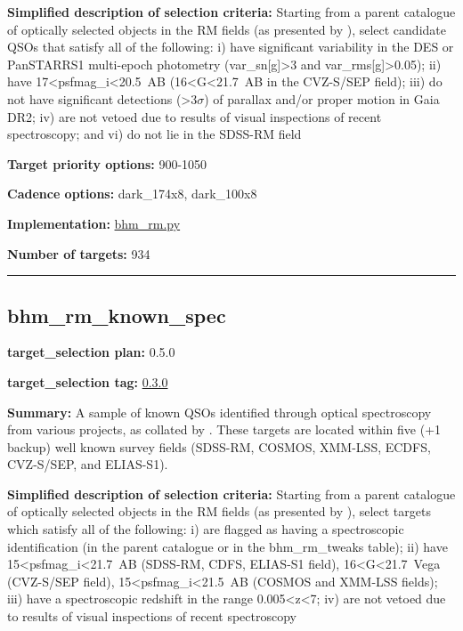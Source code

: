 \noindent\textbf{Simplified description of selection criteria:} Starting from a
parent catalogue of optically selected objects in the RM fields (as
presented by
\citealt{Yang2022}), select candidate QSOs that satisfy all of the
following: i) have significant variability in the DES or PanSTARRS1
multi-epoch photometry (var\_sn{[}g{]}\textgreater{}3 and
var\_rms{[}g{]}\textgreater{}0.05); ii) have
17\textless{}psfmag\_i\textless{}20.5~AB
(16\textless{}G\textless{}21.7~AB in the CVZ-S/SEP field); iii) do not
have significant detections (\textgreater{}3$\sigma$) of parallax and/or proper
motion in Gaia DR2; iv) are not vetoed due to results of visual
inspections of recent spectroscopy; and vi) do not lie in the SDSS-RM
field


\noindent\textbf{Target priority options:} 900-1050

\noindent\textbf{Cadence options:} dark\_174x8, dark\_100x8

\noindent\textbf{Implementation:}
\href{https://github.com/sdss/target_selection/blob/0.3.0/python/target_selection/cartons/bhm_rm.py}{bhm\_rm.py}

\noindent\textbf{Number of targets:} 934

\begin{center}\rule{0.5\linewidth}{0.5pt}\end{center}

\hypertarget{bhm_rm_known_spec_plan0.5.0}{%
\subsection{bhm\_rm\_known\_spec}\label{bhm_rm_known_spec_plan0.5.0}}

\noindent\textbf{target\_selection plan:} 0.5.0

\noindent\textbf{target\_selection tag:}
\href{https://github.com/sdss/target_selection/tree/0.3.0/}{0.3.0}

\noindent\textbf{Summary:} A sample of known QSOs identified through optical
spectroscopy from various projects, as collated by
\citet{Yang2022}. These targets are located within five (+1 backup) well
known survey fields (SDSS-RM, COSMOS, XMM-LSS, ECDFS, CVZ-S/SEP, and
ELIAS-S1).

\noindent\textbf{Simplified description of selection criteria:} Starting from a
parent catalogue of optically selected objects in the RM fields (as
presented by
\citealt{Yang2022}), select targets which satisfy all of the following: i)
are flagged as having a spectroscopic identification (in the parent
catalogue or in the bhm\_rm\_tweaks table); ii) have
15\textless{}psfmag\_i\textless{}21.7~AB (SDSS-RM, CDFS, ELIAS-S1
field), 16\textless{}G\textless{}21.7~Vega (CVZ-S/SEP field),
15\textless{}psfmag\_i\textless{}21.5~AB (COSMOS and XMM-LSS fields);
iii) have a spectroscopic redshift in the range
0.005\textless{}z\textless{}7; iv) are not vetoed due to results of
visual inspections of recent spectroscopy


